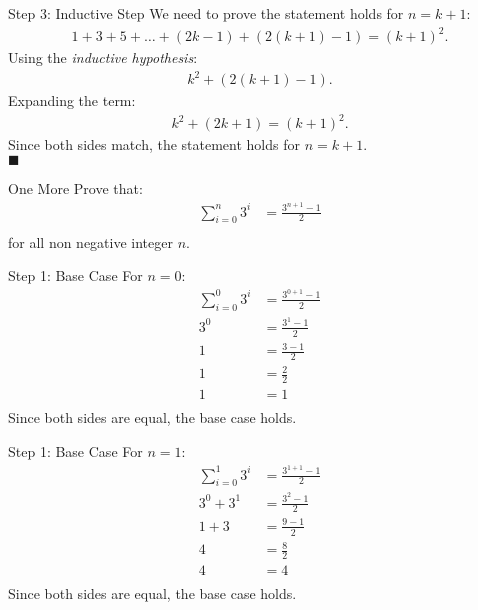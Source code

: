 \documentclass{beamer}
\renewcommand{\qed}{\\ \hfill $\blacksquare$}
\begin{document}
\begin{frame}{Step 3: Inductive Step}
    We need to prove the statement holds for $n = k+1$:
    \begin{align*}
        1 + 3 + 5 + \dots + (2k - 1) + (2(k+1) - 1) = (k+1)^2.
    \end{align*}
    \pause
    Using the \textit{inductive hypothesis}:
    \begin{align*}
        k^2 + (2(k+1) - 1).
    \end{align*}
    \pause
    Expanding the term:
    \begin{align*}
        k^2 + (2k + 1) = (k+1)^2.
    \end{align*}
    \pause
    Since both sides match, the statement holds for $n = k+1$.
    \qed
\end{frame}

\begin{frame}{One More}
    Prove that:
    \begin{align*}
        \sum_{i = 0}^n 3^i &= \frac{3^{n + 1} - 1}{2} \\
    \end{align*}
    for all non negative integer $n$.
\end{frame}

\begin{frame}{Step 1: Base Case}
    For $n = 0$:
    \begin{align*}
        \sum_{i = 0}^0 3^i &= \frac{3^{0 + 1} - 1}{2} \\
                       3^0 &= \frac{3^1 - 1}{2} \\
                         1 &= \frac{3 - 1}{2} \\
                         1 &= \frac{2}{2} \\
                         1 &= 1 \\
    \end{align*}
    Since both sides are equal, the base case holds. \checkmark
\end{frame}

\begin{frame}{Step 1: Base Case}
    For $n = 1$:
    \begin{align*}
        \sum_{i = 0}^1 3^i &= \frac{3^{1 + 1} - 1}{2} \\
                 3^0 + 3^1 &= \frac{3^2 - 1}{2} \\
                     1 + 3 &= \frac{9 - 1}{2} \\
                         4 &= \frac{8}{2} \\
                         4 &= 4 \\
    \end{align*}
    Since both sides are equal, the base case holds. \checkmark
\end{frame}
\end{document}
